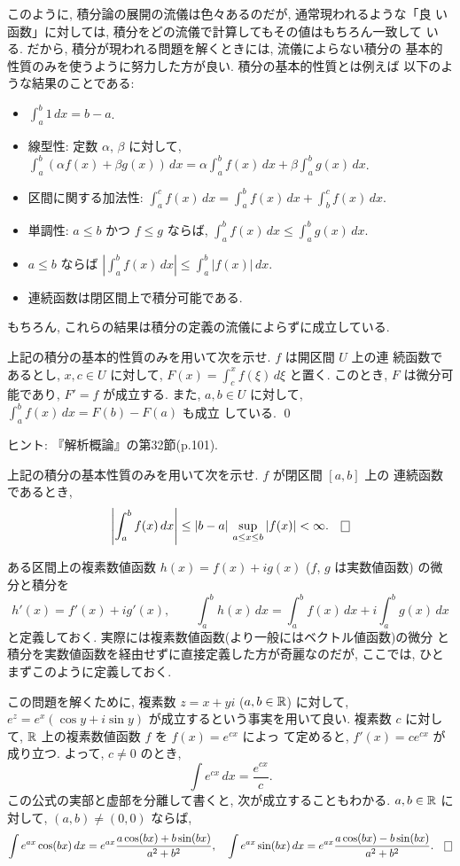 \documentclass[12pt,twoside]{jarticle}
\begin{document}
このように, 積分論の展開の流儀は色々あるのだが, 通常現われるような「良
い函数」に対しては, 積分をどの流儀で計算してもその値はもちろん一致して
いる.  だから, 積分が現われる問題を解くときには, 流儀によらない積分の
基本的性質のみを使うように努力した方が良い. 積分の基本的性質とは例えば
以下のような結果のことである:
%
\begin{itemize}
\item $\int_a^b 1\,dx = b - a$.
\item 線型性: 定数 $\alpha$, $\beta$ に対して, %
  \(
    \int_a^b (\alpha f(x) + \beta g(x)) \,dx
    = \alpha \int_a^b f(x) \,dx + \beta \int_a^b g(x) \,dx
  \).
\item 区間に関する加法性: %
  $\int_a^c f(x) \,dx = \int_a^b f(x) \,dx + \int_b^c f(x) \,dx$.
\item 単調性: $a \le b$ かつ $f \le g$ ならば, %
  $\int_a^b f(x) \,dx \le \int_a^b g(x) \,dx$.
\item $a \le b$ ならば $|\int_a^b f(x) \,dx| \le \int_a^b |f(x)| \,dx$.
\item 連続函数は閉区間上で積分可能である.
\end{itemize}
%
もちろん, これらの結果は積分の定義の流儀によらずに成立している. 

\begin{question}
  上記の積分の基本的性質のみを用いて次を示せ. $f$ は開区間 $U$ 上の連
  続函数であるとし, %
  $x,c\in U$ に対して, $F(x) = \int_c^x f(\xi)\,d\xi$ と置く. %
  このとき, $F$ は微分可能であり, $F' = f$ が成立する. %
  また, $a,b\in U$ に対して, $\int_a^b f(x) \,dx = F(b) - F(a)$ も成立
  している. \qed
\end{question}

\noindent ヒント: 『解析概論』の第32節(p.101).

\begin{question}
  上記の積分の基本性質のみを用いて次を示せ. $f$ が閉区間 $[a,b]$ 上の
  連続函数であるとき,
  \[
    \left| \int_a^b f(x) \,dx \right| 
    \le
    |b - a|\,\sup_{a\le x\le b}|f(x)|
    < \infty.
    \qed
  \]
\end{question}

ある区間上の複素数値函数 $h(x) = f(x) + i g(x)$ ($f$, $g$ は実数値函数)
の微分と積分を
\[
  h'(x) = f'(x) + i g'(x),
  \qquad
  \int_a^b h(x)\,dx = \int_a^b f(x)\,dx + i \int_a^b g(x)\,dx
\]%
と定義しておく. 実際には複素数値函数(より一般にはベクトル値函数)の微分
と積分を実数値函数を経由せずに直接定義した方が奇麗なのだが, ここでは, 
ひとまずこのように定義しておく.

\begin{question}
  この問題を解くために, 複素数 $z = x + yi$ ($a,b\in{\mathbb R}$) に対して, %
  $e^z = e^x(\cos y + i \sin y)$ が成立するという事実を用いて良い. %
  複素数 $c$ に対して, ${\mathbb R}$ 上の複素数値函数 $f$ を $f(x)=e^{cx}$ によっ
  て定めると, $f'(x)=ce^{cx}$ が成り立つ. よって, $c\ne 0$ %
  のとき, 
  \[
    \int e^{cx} \,dx = \frac{e^{cx}}{c}.
  \]%
  この公式の実部と虚部を分離して書くと, 次が成立することもわかる. %
  $a,b\in{\mathbb R}$ に対して, $(a,b)\ne(0,0)$ ならば,
  \[
    \int e^{ax} \cos(bx) \,dx
    =
    e^{ax}
    \frac{a \cos(bx) + b \sin(bx)}{a^2+b^2},
  \quad
    \int e^{ax} \sin(bx) \,dx
    =
    e^{ax}
    \frac{a \cos(bx) - b \sin(bx)}{a^2+b^2}.
  \qed
  \]
\end{question}
\end{document}
